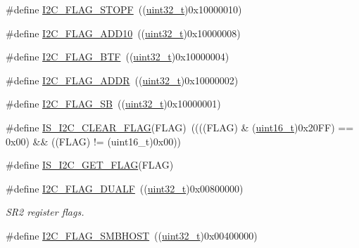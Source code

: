 \begin{DoxyCompactItemize}
\item 
\#define \hyperlink{group___i2_c__flags__definition_gacc7d993963e199a6ddba391dab8da896}{I2\+C\+\_\+\+F\+L\+A\+G\+\_\+\+S\+T\+O\+PF}~((\hyperlink{_p_e___types_8h_a33594304e786b158f3fb30289278f5af}{uint32\+\_\+t})0x10000010)
\item 
\#define \hyperlink{group___i2_c__flags__definition_ga316c78cbf34b74da96d69f702a0d1444}{I2\+C\+\_\+\+F\+L\+A\+G\+\_\+\+A\+D\+D10}~((\hyperlink{_p_e___types_8h_a33594304e786b158f3fb30289278f5af}{uint32\+\_\+t})0x10000008)
\item 
\#define \hyperlink{group___i2_c__flags__definition_ga4dc3d44342007a5cd21c3baa0d938606}{I2\+C\+\_\+\+F\+L\+A\+G\+\_\+\+B\+TF}~((\hyperlink{_p_e___types_8h_a33594304e786b158f3fb30289278f5af}{uint32\+\_\+t})0x10000004)
\item 
\#define \hyperlink{group___i2_c__flags__definition_ga5472d1196e934e0cc471aba8f66af416}{I2\+C\+\_\+\+F\+L\+A\+G\+\_\+\+A\+D\+DR}~((\hyperlink{_p_e___types_8h_a33594304e786b158f3fb30289278f5af}{uint32\+\_\+t})0x10000002)
\item 
\#define \hyperlink{group___i2_c__flags__definition_gae009ab84be03fcc438625b1c39376ad4}{I2\+C\+\_\+\+F\+L\+A\+G\+\_\+\+SB}~((\hyperlink{_p_e___types_8h_a33594304e786b158f3fb30289278f5af}{uint32\+\_\+t})0x10000001)
\item 
\#define \hyperlink{group___i2_c__flags__definition_ga66c8180841350c47627c323acfe42ee9}{I\+S\+\_\+\+I2\+C\+\_\+\+C\+L\+E\+A\+R\+\_\+\+F\+L\+AG}(F\+L\+AG)~((((F\+L\+AG) \& (\hyperlink{_p_e___types_8h_a1f1825b69244eb3ad2c7165ddc99c956}{uint16\+\_\+t})0x20\+F\+F) == 0x00) \&\& ((\+F\+L\+A\+G) != (uint16\+\_\+t)0x00))
\item 
\#define \hyperlink{group___i2_c__flags__definition_ga1a2c2a7c50cd8e33e532918106b4f6ce}{I\+S\+\_\+\+I2\+C\+\_\+\+G\+E\+T\+\_\+\+F\+L\+AG}(F\+L\+AG)
\item 
\#define \hyperlink{group___i2_c__flags__definition_ga3755b783aa73568659478c2e2e45e27f}{I2\+C\+\_\+\+F\+L\+A\+G\+\_\+\+D\+U\+A\+LF}~((\hyperlink{_p_e___types_8h_a33594304e786b158f3fb30289278f5af}{uint32\+\_\+t})0x00800000)
\begin{DoxyCompactList}\small\item\em S\+R2 register flags. \end{DoxyCompactList}\item 
\#define \hyperlink{group___i2_c__flags__definition_gaf15403a1852f39aaadbb8942ba98d97e}{I2\+C\+\_\+\+F\+L\+A\+G\+\_\+\+S\+M\+B\+H\+O\+ST}~((\hyperlink{_p_e___types_8h_a33594304e786b158f3fb30289278f5af}{uint32\+\_\+t})0x00400000)

\end{DoxyCompactItemize}
